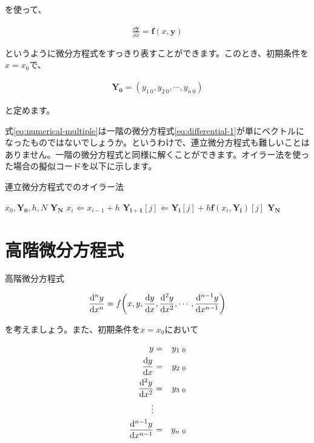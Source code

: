 \noindent
を使って、

\begin{eqnarray}
    \frac{\dd\boldsymbol{y}}{\dd x}=\boldsymbol{f}(x,\boldsymbol{y})
    \label{eq:numerical-multiple}
\end{eqnarray}

\noindent
というように微分方程式をすっきり表すことができます。このとき、初期条件を$x=x_0$で、

\begin{eqnarray}
    \boldsymbol{Y_0}=(y_{1\ 0},y_{2\ 0},\cdots,y_{n\ 0})
\end{eqnarray}

\noindent
と定めます。

式\ref{eq:numerical-multiple}は一階の微分方程式\ref{eq:differential-1}が単にベクトルになったものではないでしょうか。というわけで、連立微分方程式も難しいことはありません。一階の微分方程式と同様に解くことができます。オイラー法を使った場合の擬似コードを以下に示します。

\begin{algorithm}
\label{al:multiple}
\caption{連立微分方程式でのオイラー法}
\begin{algorithmic}
\REQUIRE $x_0,\boldsymbol{Y_0},h,N$
\ENSURE $\boldsymbol{Y_N}$
    \STATE $x_i\Leftarrow x_{i-1}+h$
        \STATE $\boldsymbol{Y_{i+1}}[j]\Leftarrow \boldsymbol{Y_i}[j]+h\boldsymbol{f}(x_i,\boldsymbol{Y_i})[j]$
    \ENDFOR
\ENDFOR
\RETURN $\boldsymbol{Y_N}$
\end{algorithmic}
\end{algorithm}








\section{高階微分方程式}
\label{higher}
高階微分方程式

\begin{eqnarray}
    \frac{\dd^ny}{\dd x^n}=f\pqty{x,y,\frac{\dd y}{\dd x},\frac{\dd^2 y}{\dd x^2},\cdots,\frac{\dd^{n-1} y}{\dd x^{n-1}}}
\end{eqnarray}

\noindent
を考えましょう。また、初期条件を$x=x_0$において

\begin{eqnarray}
    y&=&y_{1\ 0} \nonumber \\
    \frac{\dd y}{\dd x}&=&y_{2\ 0} \nonumber \\
    \frac{\dd^2 y}{\dd x^2}&=&y_{3\ 0} \nonumber \\
    \vdots \nonumber \\
    \frac{\dd^{n-1} y}{\dd x^{n-1}}&=&y_{n\ 0} \setcounter{equation}{34}
\end{eqnarray}

